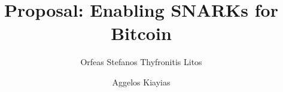\title{Proposal: Enabling SNARKs for Bitcoin}
\author{Orfeas Stefanos Thyfronitis Litos \and Aggelos Kiayias}
\maketitle
